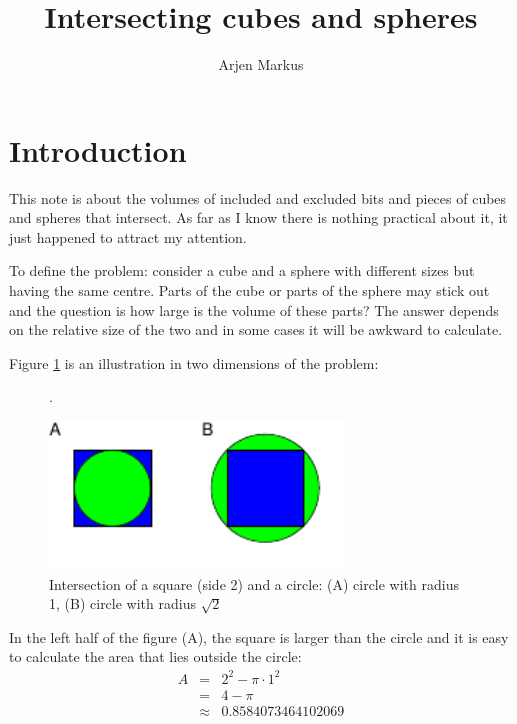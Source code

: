 \documentclass[onecolumn]{article}
\begin{document}
\title{Intersecting cubes and spheres}

\author{Arjen Markus}

\maketitle

\section*{Introduction}
This note is about the volumes of included and excluded bits and pieces of cubes and spheres that intersect.
As far as I know there is nothing practical about it, it just happened to attract my attention.

To define the problem: consider a cube and a sphere with different sizes but having the same centre.
Parts of the cube or parts of the sphere may stick out and the question is how large is the volume
of these parts? The answer depends on the relative size of the two and in some cases it will be
awkward to calculate.

Figure \ref{square_circle} is an illustration in two dimensions of the problem:

\begin{figure}[H]
\caption{Intersection of a square (side 2) and a circle: (A) circle with radius 1, (B) circle with radius $\sqrt{2}$}.
\label{square_circle}
\begin{center}
\includegraphics[width=0.7\textwidth]{circle_square_sketch.pdf}
\end{center}
\end{figure}

In the left half of the figure (A), the square is larger than the circle and it is easy to calculate
the area that lies outside the circle:
\begin{eqnarray}
\nonumber    A &=& 2^2 - \pi \cdot 1^2 \\
\nonumber      &=& 4 - \pi \\
\nonumber      &\approx& 0.8584073464102069
\end{eqnarray}
\end{document}
